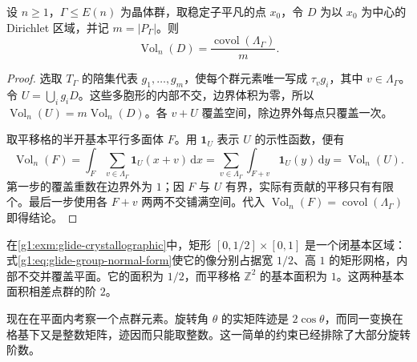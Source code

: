 \begin{corollary}
	\label{g1:cor:crystallographic-cell-volume}
	设 \(n\ge1\)，\(\Gamma\le E(n)\) 为晶体群，取稳定子平凡的点 \(x_0\)，令 \(D\) 为以 \(x_0\) 为中心的 Dirichlet 区域，并记 \(m=|P_\Gamma|\)。则
	\[
		\operatorname{Vol}_n(D)=\frac{\operatorname{covol}(\Lambda_\Gamma)}{m}.
	\]
\end{corollary}
\begin{proof}
	选取 \(T_\Gamma\) 的陪集代表 \(g_1,\ldots,g_m\)，使每个群元素唯一写成 \(\tau_vg_i\)，其中 \(v\in\Lambda_\Gamma\)。令 \(U=\bigcup_i g_iD\)。这些多胞形的内部不交，边界体积为零，所以 \(\operatorname{Vol}_n(U)=m\operatorname{Vol}_n(D)\)。各 \(v+U\) 覆盖空间，除边界外每点只覆盖一次。

	取平移格的半开基本平行多面体 \(F\)。用 \(\mathbf1_U\) 表示 \(U\) 的示性函数，便有
	\[
		\operatorname{Vol}_n(F)
		=\int_F\sum_{v\in\Lambda_\Gamma}\mathbf1_U(x+v)\,\mathrm{d}x
		=\sum_{v\in\Lambda_\Gamma}\int_{F+v}\mathbf1_U(y)\,\mathrm{d}y
		=\operatorname{Vol}_n(U).
	\]
	第一步的覆盖重数在边界外为 \(1\)；因 \(F\) 与 \(U\) 有界，实际有贡献的平移只有有限个。最后一步使用各 \(F+v\) 两两不交铺满空间。代入 \(\operatorname{Vol}_n(F)=\operatorname{covol}(\Lambda_\Gamma)\) 即得结论。
\end{proof}

在\cref{g1:exm:glide-crystallographic}中，矩形 \([0,1/2]\times[0,1]\) 是一个闭基本区域：式\eqref{g1:eq:glide-group-normal-form}使它的像分别占据宽 \(1/2\)、高 \(1\) 的矩形网格，内部不交并覆盖平面。它的面积为 \(1/2\)，而平移格 \(\mathbb Z^2\) 的基本面积为 \(1\)。这两种基本面积相差点群的阶 \(2\)。

\ProseParagraphBreak

现在在平面内考察一个点群元素。旋转角 \(\theta\) 的实矩阵迹是 \(2\cos\theta\)，而同一变换在格基下又是整数矩阵，迹因而只能取整数。这一简单的约束已经排除了大部分旋转阶数。

